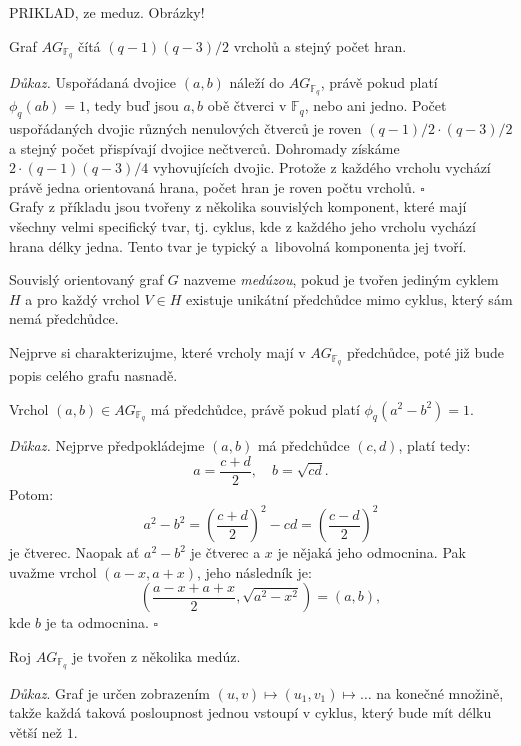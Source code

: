\documentclass[12pt]{report}
\begin{document}
PRIKLAD, ze meduz. Obrázky!

\begin{veta}\label{pocetprvkuAG}
Graf $AG_{\mathbb{F}_q}$ čítá $(q-1)(q-3)/2$ vrcholů a stejný počet hran.
\end{veta}
\noindent \textit{Důkaz.} Uspořádaná dvojice $(a,b)$ náleží do $AG_{\mathbb{F}_q}$, právě pokud platí $\phi_q(ab) = 1$, tedy buď jsou $a,b$ obě čtverci v $\mathbb{F}_q$, nebo ani jedno. Počet uspořádaných dvojic různých nenulových čtverců je roven $(q-1)/2 \cdot (q-3)/2$ a stejný počet přispívají dvojice nečtverců. Dohromady získáme $2 \cdot (q-1)(q-3)/4$ vyhovujících dvojic. Protože z každého vrcholu vychází právě jedna orientovaná hrana, počet hran je roven počtu vrcholů. \hfill $\square$\\

Grafy z příkladu jsou tvořeny z několika souvislých komponent, které mají všechny velmi specifický tvar, tj. cyklus, kde z každého jeho vrcholu vychází hrana délky jedna. Tento tvar je typický a~libovolná komponenta jej tvoří.

\begin{definice}
Souvislý orientovaný graf $G$ nazveme \textit{medúzou}, pokud je tvořen jediným cyklem $H$ a pro každý vrchol $V \in H$ existuje unikátní předchůdce mimo cyklus, který sám nemá předchůdce.
\end{definice}

Nejprve si charakterizujme, které vrcholy mají v $AG_{\mathbb{F}_q}$ předchůdce, poté již bude popis celého grafu nasnadě.

\begin{lemma}
Vrchol $(a,b) \in AG_{\mathbb{F}_q}$ má předchůdce, právě pokud platí $\phi_q(a^2-b^2)=1$.
\end{lemma}

\noindent \textit{Důkaz.} Nejprve předpokládejme $(a,b)$ má předchůdce $(c,d)$, platí tedy:
\begin{equation*}
a = \frac{c+d}{2}, \quad b = \sqrt{cd}.
\end{equation*}
Potom:
\begin{equation*}
a^2 - b^2 = \left(\frac{c+d}{2} \right)^2 - cd = \left( \frac{c-d}{2} \right)^2
\end{equation*}
je čtverec. Naopak ať $a^2-b^2$ je čtverec a $x$ je nějaká jeho odmocnina. Pak uvažme vrchol $(a-x,a+x)$, jeho následník je: $$\left(\frac{a-x+a+x}{2}, \sqrt{a^2-x^2} \right)= \left(a, b \right),$$
kde $b$ je ta  odmocnina. \hfill $\square$
\begin{veta}\label{meduzy}
Roj $AG_{\mathbb{F}_q}$ je tvořen z několika medúz.
\end{veta}
\noindent \textit{Důkaz}. Graf je určen zobrazením $(u,v) \longmapsto (u_1,v_1) \longmapsto \dots$ na konečné množině, takže každá taková posloupnost jednou vstoupí v cyklus, který bude mít délku větší než $1$. 
\end{document}
